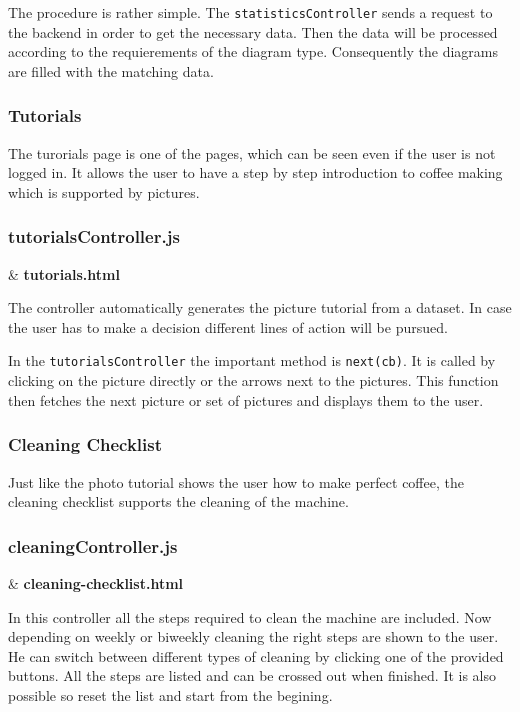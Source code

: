 The procedure is rather simple. The \texttt{statisticsController} sends
a request to the backend in order to get the necessary data. Then the
data will be processed according to the requierements of the diagram
type. Consequently the diagrams are filled with the matching data.

\subsubsection{Tutorials}\label{tutorials}

The turorials page is one of the pages, which can be seen even if the
user is not logged in. It allows the user to have a step by step
introduction to coffee making which is supported by pictures.

\subsubsection*{tutorialsController.js} \& \textbf{tutorials.html}

The controller automatically generates the picture tutorial from a
dataset. In case the user has to make a decision different lines of
action will be pursued.

In the \texttt{tutorialsController} the important method is
\texttt{next(cb)}. It is called by clicking on the picture directly or
the arrows next to the pictures. This function then fetches the next
picture or set of pictures and displays them to the user.

\subsubsection{Cleaning Checklist}\label{cleaning-checklist}

Just like the photo tutorial shows the user how to make perfect coffee,
the cleaning checklist supports the cleaning of the machine.

\subsubsection*{cleaningController.js} \& \textbf{cleaning-checklist.html}

In this controller all the steps required to clean the machine are
included. Now depending on weekly or biweekly cleaning the right steps
are shown to the user. He can switch between different types of cleaning
by clicking one of the provided buttons. All the steps are listed and
can be crossed out when finished. It is also possible so reset the list
and start from the begining.

